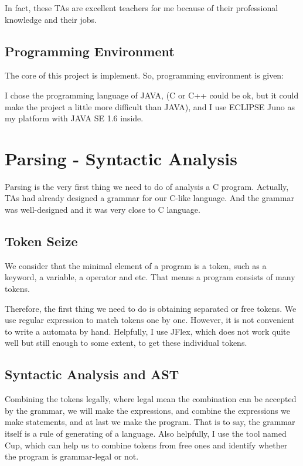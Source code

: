 \documentclass[preprint, 9pt]{sigplanconf}
\begin{document}
    In fact, these TAs are excellent teachers for me because of their professional knowledge and their jobs.

    \subsection{Programming Environment}
    The core of this project is implement.
    So, programming environment is given:

    I chose the programming language of JAVA, (C or C++ could be ok, but it could make the project a little more difficult than JAVA), and I use ECLIPSE Juno as my platform with JAVA SE 1.6 inside.


\section{Parsing - Syntactic Analysis}

    Parsing is the very first thing we need to do of analysis a C program.
    Actually, TAs had already designed a grammar for our C-like language.
    And the grammar was well-designed and it was very close to C language.

    \subsection{Token Seize}
    We consider that the minimal element of a program is a token, such as a keyword, a variable, a operator and etc.
    That means a program consists of many tokens.

    Therefore, the first thing we need to do is obtaining separated or free tokens.
    We use regular expression to match tokens one by one.
    However, it is not convenient to write a automata by hand.
    Helpfully, I use JFlex, which does not work quite well but still enough to some extent, to get these individual tokens.

    \subsection{Syntactic Analysis and AST}
    Combining the tokens legally, where legal mean the combination can be accepted by the grammar, we will make the expressions, and combine the expressions we make statements, and at last we make the program.
    That is to say, the grammar itself is a rule of generating of a language.
    Also helpfully, I use the tool named Cup, which can help us to combine tokens from free ones and identify whether the program is grammar-legal or not.
\end{document}
